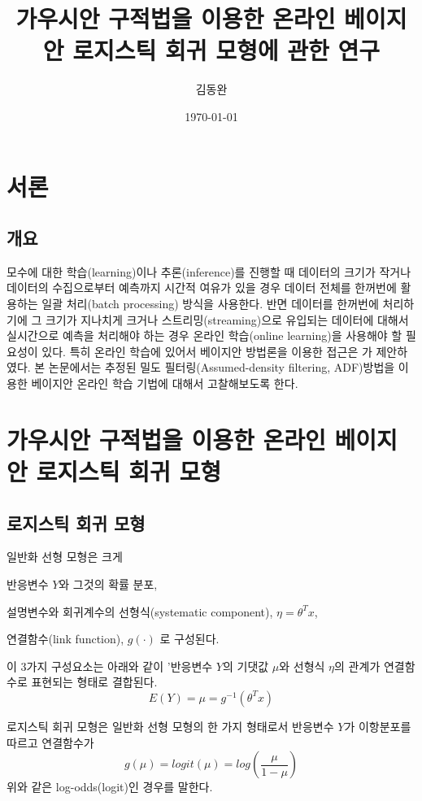 \documentclass[oneside,b5paper,11pt]{book} %
\title{가우시안 구적법을 이용한 온라인 베이지안 로지스틱 회귀 모형에 관한 연구}
\author{김동완}
\date{\today}
\begin{document}
\maketitle

\tableofcontents

\chapter{서론}

\section{개요}
 모수에 대한 학습(learning)이나 추론(inference)를 진행할 때 데이터의 크기가 작거나 데이터의 수집으로부터 예측까지 시간적 여유가 있을 경우 데이터 전체를 한꺼번에 활용하는 일괄 처리(batch processing) 방식을 사용한다. 반면 데이터를 한꺼번에 처리하기에 그 크기가 지나치게 크거나 스트리밍(streaming)으로 유입되는 데이터에 대해서 실시간으로 예측을 처리해야 하는 경우 온라인 학습(online learning)을 사용해야 할 필요성이 있다.\citep{Opper1999} 특히 온라인 학습에 있어서 베이지안 방법론을 이용한 접근은 \citet{Opper1996} 가 제안하였다. 본 논문에서는 추정된 밀도 필터링(Assumed-density filtering, ADF)방법을 이용한 베이지안 온라인 학습 기법에 대해서 고찰해보도록 한다.
 
%
\chapter{가우시안 구적법을
 이용한 온라인 베이지안 로지스틱 회귀 모형}
 
\section{로지스틱 회귀 모형}

일반화 선형 모형은 크게 
\begin{inparaenum}[i)]
\item 반응변수 $Y$와 그것의 확률 분포,\quad
\item 설명변수와 회귀계수의 선형식(systematic component), $\eta = \theta^T x$, \quad
\item 연결함수(link function), $g(\cdot)$ 로 구성된다.
\end{inparaenum} 이 3가지 구성요소는 아래와 같이 '반응변수 $Y$의 기댓값 $\mu$와 선형식 $\eta$의 관계가 연결함수로 표현되는 형태로 결합된다.\citep{Agresti1996}
$$E(Y) = \mu = g^{-1}(\theta^T x)$$

 로지스틱 회귀 모형은 일반화 선형 모형의 한 가지 형태로서 반응변수 $Y$가 이항분포를 따르고 연결함수가 
$$
g(\mu) = logit(\mu) =log \left(\frac{\mu}{1-\mu}\right)
$$
위와 같은 log-odds(logit)인 경우를 말한다.
\end{document}
